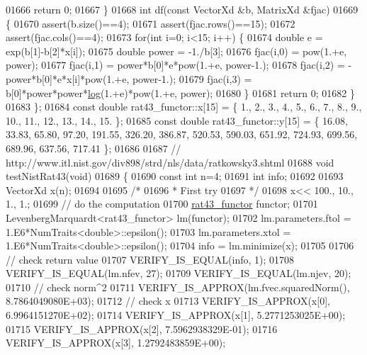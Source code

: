 \begin{DoxyCode}
01666         \textcolor{keywordflow}{return} 0;
01667     \}
01668     \textcolor{keywordtype}{int} df(\textcolor{keyword}{const} VectorXd &b, MatrixXd &fjac)
01669     \{
01670         assert(b.size()==4);
01671         assert(fjac.rows()==15);
01672         assert(fjac.cols()==4);
01673         \textcolor{keywordflow}{for}(\textcolor{keywordtype}{int} i=0; i<15; i++) \{
01674             \textcolor{keywordtype}{double} e = exp(b[1]-b[2]*x[i]);
01675             \textcolor{keywordtype}{double} power = -1./b[3];
01676             fjac(i,0) = pow(1.+e, power);
01677             fjac(i,1) = power*b[0]*e*pow(1.+e, power-1.);
01678             fjac(i,2) = -power*b[0]*e*x[i]*pow(1.+e, power-1.);
01679             fjac(i,3) = b[0]*power*power*\hyperlink{structlog}{log}(1.+e)*pow(1.+e, power);
01680         \}
01681         \textcolor{keywordflow}{return} 0;
01682     \}
01683 \};
01684 \textcolor{keyword}{const} \textcolor{keywordtype}{double} rat43\_functor::x[15] = \{ 1., 2., 3., 4., 5., 6., 7., 8., 9., 10., 11., 12., 13., 14., 15. \};
01685 \textcolor{keyword}{const} \textcolor{keywordtype}{double} rat43\_functor::y[15] = \{ 16.08, 33.83, 65.80, 97.20, 191.55, 326.20, 386.87, 520.53, 590.03, 
      651.92, 724.93, 699.56, 689.96, 637.56, 717.41 \};
01686 
01687 \textcolor{comment}{// http://www.itl.nist.gov/div898/strd/nls/data/ratkowsky3.shtml}
01688 \textcolor{keywordtype}{void} testNistRat43(\textcolor{keywordtype}{void})
01689 \{
01690   \textcolor{keyword}{const} \textcolor{keywordtype}{int} n=4;
01691   \textcolor{keywordtype}{int} info;
01692 
01693   VectorXd x(n);
01694 
01695   \textcolor{comment}{/*}
01696 \textcolor{comment}{   * First try}
01697 \textcolor{comment}{   */}
01698   x<< 100., 10., 1., 1.;
01699   \textcolor{comment}{// do the computation}
01700   \hyperlink{structrat43__functor}{rat43\_functor} functor;
01701   LevenbergMarquardt<rat43\_functor> lm(functor);
01702   lm.parameters.ftol = 1.E6*NumTraits<double>::epsilon();
01703   lm.parameters.xtol = 1.E6*NumTraits<double>::epsilon();
01704   info = lm.minimize(x);
01705 
01706   \textcolor{comment}{// check return value}
01707   VERIFY\_IS\_EQUAL(info, 1);
01708   VERIFY\_IS\_EQUAL(lm.nfev, 27);
01709   VERIFY\_IS\_EQUAL(lm.njev, 20);
01710   \textcolor{comment}{// check norm^2}
01711   VERIFY\_IS\_APPROX(lm.fvec.squaredNorm(), 8.7864049080E+03);
01712   \textcolor{comment}{// check x}
01713   VERIFY\_IS\_APPROX(x[0], 6.9964151270E+02);
01714   VERIFY\_IS\_APPROX(x[1], 5.2771253025E+00);
01715   VERIFY\_IS\_APPROX(x[2], 7.5962938329E-01);
01716   VERIFY\_IS\_APPROX(x[3], 1.2792483859E+00);

\end{DoxyCode}
